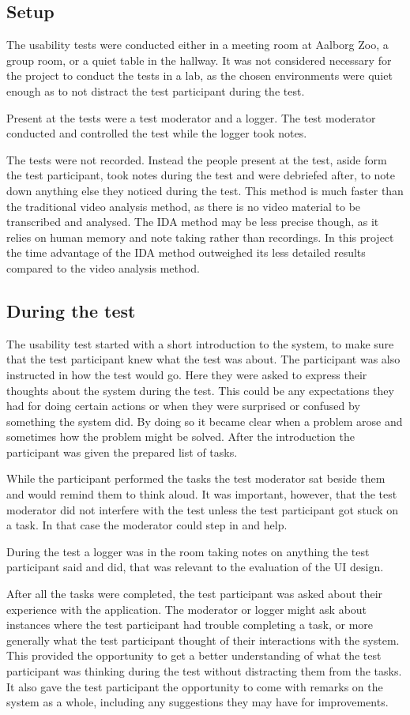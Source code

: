 \subsection{Setup}
The usability tests were conducted either in a meeting room at Aalborg Zoo, a group room, or a quiet table in the hallway. It was not considered necessary for the project to conduct the tests in a lab, as the chosen environments were quiet enough as to not distract the test participant during the test. 
\par
Present at the tests were a test moderator and a logger. The test moderator conducted and controlled the test while the logger took notes. 
\par
The tests were not recorded. Instead the people present at the test, aside form the test participant, took notes during the test and were debriefed after, to note down anything else they noticed during the test. This method is much faster than the traditional video analysis method, as there is no video material to be transcribed and analysed. The IDA method may be less precise though, as it relies on human memory and note taking rather than recordings. In this project the time advantage of the IDA method outweighed its less detailed results compared to the video analysis method. 

\subsection{During the test}
The usability test started with a short introduction to the system, to make sure that the test participant knew what the test was about. The participant was also instructed in how the test would go. Here they were asked to express their thoughts about the system during the test. This could be any expectations they had for doing certain actions or when they were surprised or confused by something the system did. By doing so it became clear when a problem arose and sometimes how the problem might be solved. After the introduction the participant was given the prepared list of tasks. 
\par
While the participant performed the tasks the test moderator sat beside them and would remind them to think aloud. It was important, however, that the test moderator did not interfere with the test unless the test participant got stuck on a task. In that case the moderator could step in and help.
\par
During the test a logger was in the room taking notes on anything the test participant said and did, that was relevant to the evaluation of the UI design. 
\par
After all the tasks were completed, the test participant was asked about their experience with the application. The moderator or logger might ask about instances where the test participant had trouble completing a task, or more generally what the test participant thought of their interactions with the system. This provided the opportunity to get a better understanding of what the test participant was thinking during the test without distracting them from the tasks. It also gave the test participant the opportunity to come with remarks on the system as a whole, including any suggestions they may have for improvements. 

